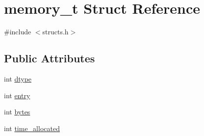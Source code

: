 \hypertarget{structmemory__t}{\section{memory\-\_\-t Struct Reference}
\label{structmemory__t}
}


{\ttfamily \#include $<$structs.\-h$>$}

\subsection*{Public Attributes}
\begin{DoxyCompactItemize}
\item 
int \hyperlink{structmemory__t_afe67a9517ec96c3fd688b4e966fab07f}{dtype}
\item 
int \hyperlink{structmemory__t_a986bfd57925f4a00654d7a18d7dc81c3}{entry}
\item 
int \hyperlink{structmemory__t_aa76ff43845139d4f10ab1c42312f9283}{bytes}
\item 
int \hyperlink{structmemory__t_a3e9a0e482bd948492bef419b545d3580}{time\-\_\-allocated}
\end{DoxyCompactItemize}



